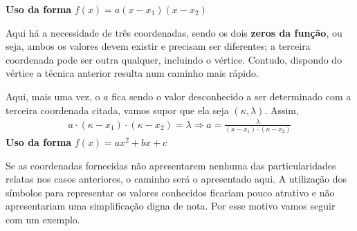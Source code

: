 \textbf{Uso da forma} \(f(x)=a(x-x_1)(x-x_2)\)

Aqui há a necessidade de três coordenadas, sendo os dois \textbf{zeros da função}, ou seja, ambos os valores devem existir e precisam ser diferentes; a terceira coordenada pode ser outra qualquer, incluindo o vértice. Contudo, dispondo do vértice a técnica anterior resulta num caminho mais rápido.

Aqui, mais uma vez, o \(a\) fica sendo o valor desconhecido a ser determinado com a terceira coordenada citada, vamos supor que ela seja \((\kappa,\lambda)\). Assim,
\begin{equation*}
\begin{split}a\cdot (\kappa -x_1) \cdot (\kappa -x_2) = \lambda \Rightarrow a= \frac{\lambda}{(\kappa-x_1) \cdot (\kappa-x_2)}\end{split}
\end{equation*}
\textbf{Uso da forma} \(f(x)=ax^2+bx+c\)

Se as coordenadas fornecidas não apresentarem nenhuma das particularidades relatas nos casos anteriores, o caminho será o apresentado aqui. A utilização dos símbolos para representar os valores conhecidos ficariam pouco atrativo e não apresentariam uma simplificação digna de nota. Por esse motivo vamos seguir com um exemplo.

